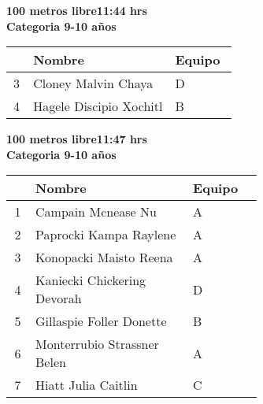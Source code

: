 \begin{minipage}{0.95\linewidth}\vspace{0.5cm} 
\begin{flushleft}
\textbf{
\hspace{-0.15cm}100 metros libre\hspace{1.5cm}11:44 hrs \\Categoria 9-10 años}\vspace{-0.2cm} 
\end{flushleft}
\begin{tabular}{cp{0.63\linewidth}l}
\hline
& \textbf{Nombre} & \textbf{Equipo} \\ \hline
3 & Cloney Malvin Chaya & D \\ 
4 & Hagele Discipio Xochitl & B \\ 
\end{tabular}
\end{minipage}
\begin{minipage}{0.95\linewidth}\vspace{0.5cm} 
\begin{flushleft}
\textbf{
\hspace{-0.15cm}100 metros libre\hspace{1.5cm}11:47 hrs \\Categoria 9-10 años}\vspace{-0.2cm} 
\end{flushleft}
\begin{tabular}{cp{0.63\linewidth}l}
\hline
& \textbf{Nombre} & \textbf{Equipo} \\ \hline
1 & Campain Mcnease Nu & A \\ 
2 & Paprocki Kampa Raylene & A \\ 
3 & Konopacki Maisto Reena & A \\ 
4 & Kaniecki Chickering Devorah & D \\ 
5 & Gillaspie Foller Donette & B \\ 
6 & Monterrubio Strassner Belen & A \\ 
7 & Hiatt Julia Caitlin & C \\ 
\end{tabular}
\end{minipage}
